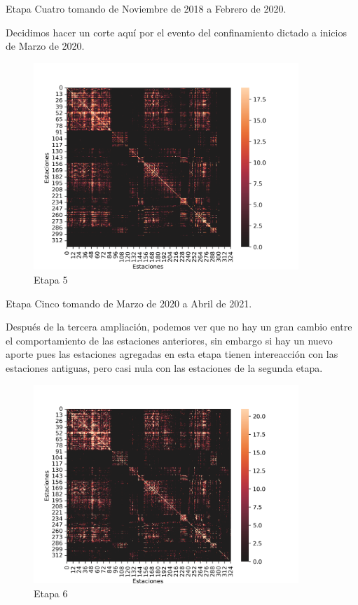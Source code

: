 \documentclass[
]{article}
\begin{document}
Etapa Cuatro tomando de Noviembre de 2018 a Febrero de 2020.

Decidimos hacer un corte aquí por el evento del confinamiento dictado a
inicios de Marzo de 2020.

\begin{figure}[h]
\centering
\includegraphics[width=10cm]{../plots/resultsCinco.png}
\caption{Etapa 5}
\end{figure}

Etapa Cinco tomando de Marzo de 2020 a Abril de 2021.

Después de la tercera ampliación, podemos ver que no hay un gran cambio
entre el comportamiento de las estaciones anteriores, sin embargo si hay
un nuevo aporte pues las estaciones agregadas en esta etapa tienen
intereacción con las estaciones antiguas, pero casi nula con las
estaciones de la segunda etapa.

\begin{figure}[h]
\centering
\includegraphics[width=10cm]{../plots/resultsSeis.png}
\caption{Etapa 6}
\end{figure}
\end{document}
